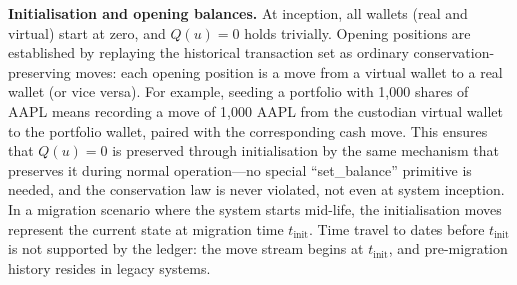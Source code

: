 \documentclass[11pt,a4paper]{article}
\begin{document}
\medskip
\noindent\textbf{Initialisation and opening balances.} At inception, all wallets (real and virtual) start at zero, and $Q(u) = 0$ holds trivially. Opening positions are established by replaying the historical transaction set as ordinary conservation-preserving moves: each opening position is a move from a virtual wallet to a real wallet (or vice versa). For example, seeding a portfolio with 1{,}000 shares of AAPL means recording a move of 1{,}000 AAPL from the custodian virtual wallet to the portfolio wallet, paired with the corresponding cash move. This ensures that $Q(u) = 0$ is preserved through initialisation by the same mechanism that preserves it during normal operation---no special ``set\_balance'' primitive is needed, and the conservation law is never violated, not even at system inception. In a migration scenario where the system starts mid-life, the initialisation moves represent the current state at migration time $t_{\text{init}}$. Time travel to dates before $t_{\text{init}}$ is not supported by the ledger: the move stream begins at $t_{\text{init}}$, and pre-migration history resides in legacy systems.
\end{document}
